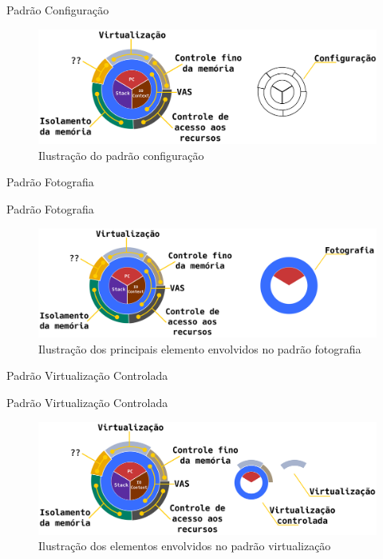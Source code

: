 \documentclass[xcolor={usenames,svgnames,dvipsnames},brazil,english,12pt,aspectratio=149]{beamer}
\begin{document}
\begin{frame}{Padrão Configuração}
	\begin{figure}[!h]
		\centering
		\includegraphics[width=\textwidth]{decomposition_conf}
		\caption{Ilustração do padrão configuração}
		\label{fig:decomposicao_conf}
	\end{figure}
\end{frame}

\begin{frame}{Padrão Fotografia}
\end{frame}

\begin{frame}{Padrão Fotografia}
	\begin{figure}[!h]
		\centering
		\includegraphics[width=.8\textwidth]{decomposition_fotografia}
		\caption{Ilustração dos principais elemento envolvidos no padrão fotografia}
		\label{fig:decomposicao_fotografia}
	\end{figure}
\end{frame}

\begin{frame}{Padrão Virtualização Controlada}
\end{frame}

\begin{frame}{Padrão Virtualização Controlada}
	\begin{figure}[!h]
		\centering
		\includegraphics[width=.8\textwidth]{decomposicao_virt_controlada}
		\caption{Ilustração dos elementos envolvidos no padrão virtualização}
		\label{fig:decomposicao_virt}
	\end{figure}
\end{frame}
\end{document}
